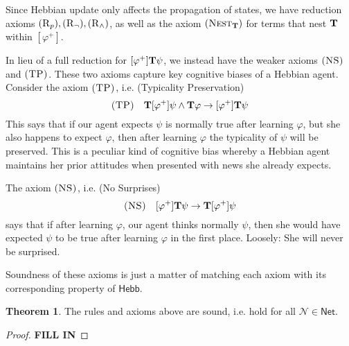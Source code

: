 \documentclass[letterpaper]{article}
\theoremstyle{definition}
\newtheorem{theorem}{Theorem}
\newtheorem{lemma}[theorem]{Lemma}
\newcommand{\semantics}[1]{[\![\mbox{\em $ #1 $\/}]\!]}
\newcommand{\axiom}{\textsc}
\newcommand{\Typ}{\textrm{\textup{\textbf{T}}}}
\newcommand{\Hebb}{\textsf{Hebb}}
\newcommand{\AllNets}{\mathsf{Net}}
\newcommand{\Net}{\mathcal{N}}
\begin{document}
Since Hebbian update only affects the propagation of states, we have reduction axioms $(\axiom{R}_p), (\axiom{R}_\neg), (\axiom{R}_\land)$, as well as the axiom $(\axiom{Nest}_\Typ)$ for terms that nest $\Typ$ within $[\varphi^+]$.

In lieu of a full reduction for $[\varphi^+] \Typ \psi$, we instead have the weaker axioms $\axiom{(NS)}$ and $\axiom{(TP)}$.  These two axioms capture key cognitive biases of a Hebbian agent.  Consider the axiom $\axiom{(TP)}$, i.e. (Typicality Preservation)
\[
\axiom{(TP)} \quad \Typ [\varphi^+] \psi \land \Typ \varphi \to [\varphi^+] \Typ \psi
\]
This says that if our agent expects $\psi$ is normally true after learning $\varphi$, but she also happens to expect $\varphi$, then after learning $\varphi$ the typicality of $\psi$ will be preserved.  This is a peculiar kind of cognitive bias whereby a Hebbian agent maintains her prior attitudes when presented with news she already expects.

The axiom $\axiom{(NS)}$, i.e. (No Surprises)
\[
\axiom{(NS)} \quad [\varphi^+] \Typ \psi \to \Typ [\varphi^+] \psi
\]
says that if after learning $\varphi$, our agent thinks normally $\psi$, then she would have expected $\psi$ to be true after learning $\varphi$ in the first place.  Loosely: She will never be surprised.




Soundness of these axioms is just a matter of matching each axiom with its corresponding property of $\Hebb$.

\begin{theorem}
The rules and axioms above are sound, i.e. hold for all $\Net \in \AllNets$.
\end{theorem}
\begin{proof}
\textbf{\textcolor{myred}{FILL IN}}
\end{proof}
\end{document}
